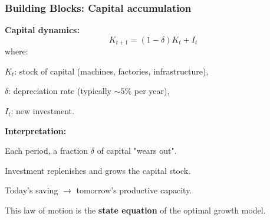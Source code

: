 \documentclass[xcolor=x11names,compress,aspectratio=169]{beamer}%
\makeatletter
\renewenvironment{itemize}{\begin{compactitemize}[<+-| alert@+>]}{\end{compactitemize}}
\makeatother
\begin{document}
\begin{frame}%
%

\frametitle{Building Blocks: Capital accumulation}%


\begin{itemize}
\item \textbf{Capital dynamics:}
\[
K_{t+1} = (1 - \delta) K_{t} + I_{t}
\]
where:

\begin{itemize}
\item $K_{t}$: stock of capital (machines, factories, infrastructure),

\item $\delta$: depreciation rate (typically $\sim5\%$ per year),

\item $I_{t}$: new investment.
\end{itemize}

\vspace{0.3cm}

\item \textbf{Interpretation:}

\begin{itemize}
\item Each period, a fraction $\delta$ of capital "wears out".

\item Investment replenishes and grows the capital stock.

\item Today's saving $\to$ tomorrow's productive capacity.
\end{itemize}

\vspace{0.3cm}

\item This law of motion is the \textbf{state equation} of the optimal growth model.
\end{itemize}

%

\transboxout
\end{frame}%
%
\end{document}
